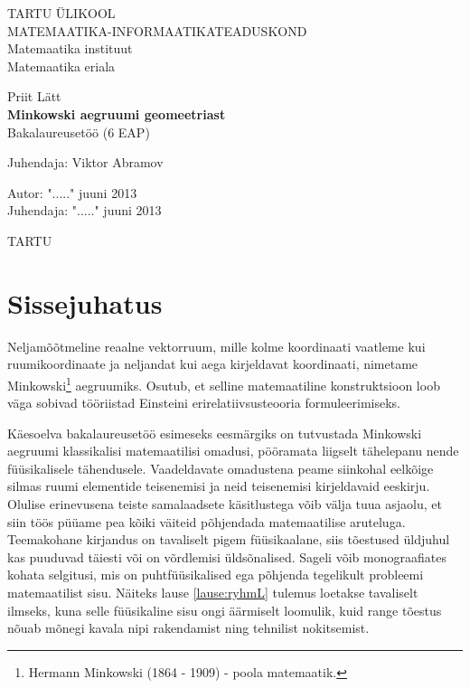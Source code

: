 \documentclass[12pt,a4paper,oneside]{article}
\theoremstyle{plain}
\theoremstyle{definition}
\numberwithin{equation}{section}
\def\title{Minkowski aegruumi geomeetriast}
\def\author{Priit Lätt}
\begin{document}
\begin{titlepage}
\begin{center}

{\large TARTU ÜLIKOOL}\\[0.3cm]
{\large MATEMAATIKA-INFORMAATIKATEADUSKOND}\\[0.3cm]
{\large Matemaatika instituut}\\[0.3cm]
{\large Matemaatika eriala} %

\vfill
{\large \author}\\[0.3cm]
{\huge \textbf{\title}}\\[0.3cm]
{\large Bakalaureusetöö (6 EAP)} %

\vfill

\begin{flushright}
{\large Juhendaja: Viktor Abramov}
\end{flushright}

\vfill

\begin{flushleft}
{\large
Autor: \dotfill "....." juuni 2013\\
Juhendaja: \dotfill "....." juuni 2013
}
\end{flushleft}

\vfill

{\large TARTU \the\year}

\end{center}
\end{titlepage}

\tableofcontents

\newpage
\section*{Sissejuhatus}

Neljamõõtmeline reaalne vektorruum, mille kolme koordinaati 
vaatleme kui ruumikoordinaate ja neljandat kui aega kirjeldavat 
koordinaati, nimetame Minkowski\footnote{Hermann Minkowski 
(1864 - 1909) - poola matemaatik.} aegruumiks. Osutub, et 
selline matemaatiline konstruktsioon loob väga sobivad 
tööriistad Einsteini erirelatiivsusteooria formuleerimiseks.

Käesoelva bakalaureusetöö esimeseks eesmärgiks on 
tutvustada Minkowski aeg\-ruumi klassikalisi matemaatilisi 
omadusi, pööramata liigselt tähelepanu nende füü\-sikalisele 
tähendusele. Vaadeldavate omadustena peame siinkohal 
eelkõige silmas ruumi elementide teisenemisi ja neid 
teisenemisi kirjeldavaid eeskirju. 
Olulise erinevusena teiste samalaadsete käsitlustega võib 
välja tuua asjaolu, et siin töös püüame pea kõiki väiteid 
põhjendada matemaatilise aruteluga. Teemakohane kirjandus 
on tavaliselt pigem füüsikaalane, siis tõestused üldjuhul kas 
puuduvad täiesti või on võrdlemisi üldsõnalised. Sageli võib 
monograafiates kohata selgitusi, mis on puhtfüüsikalised ega 
põhjenda tegelikult probleemi matemaatilist sisu. Näiteks lause
\ref{lause:ryhmL} tulemus loetakse tavaliselt ilmseks, kuna 
selle füüsikaline sisu ongi äärmiselt loomulik, kuid range 
tõestus nõuab mõnegi kavala nipi rakendamist ning tehnilist 
nokitsemist. 
\end{document}
